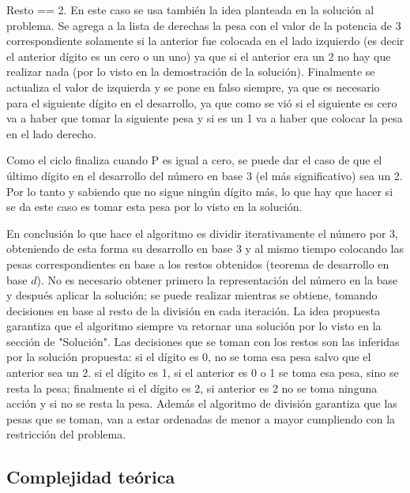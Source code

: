 \begin{enumerate}
{			Resto == 2. En este caso se usa también la idea planteada en la solución al problema. Se agrega a la lista de derechas la pesa con el valor de la potencia de 3 correspondiente solamente si la anterior fue colocada en el lado izquierdo (es decir el anterior dígito es un cero o un uno) ya que si el anterior era un 2 no hay que realizar nada (por lo visto en la demostración de la solución). Finalmente se actualiza el valor de izquierda y se pone en falso siempre, ya que es necesario para el siguiente dígito en el desarrollo, ya que como se vió si el siguiente es cero va a haber que tomar la siguiente pesa y si es un 1 va a haber que colocar la pesa en el lado derecho.	
		}
	\end{enumerate}

	Como el ciclo finaliza cuando P es igual a cero, se puede dar el caso de que el último dígito en el desarrollo del número en base 3 (el más significativo) sea un 2. Por lo tanto y sabiendo que no sigue ningún dígito más, lo que hay que hacer si se da este caso es tomar esta pesa por lo visto en la solución.

	En conclusión lo que hace el algoritmo es dividir iterativamente el número por 3, obteniendo de esta forma su desarrollo en base 3 y al mismo tiempo colocando las pesas correspondientes en base a los restos obtenidos (teorema de desarrollo en base $d$). No es necesario obtener primero la representación del número en la base y después aplicar la solución; se puede realizar mientras se obtiene, tomando decisiones en base al resto de la división en cada iteración. La idea propuesta garantiza que el algoritmo siempre va retornar una solución por lo visto en la sección de "Solución". Las decisiones que se toman con los restos son las inferidas por la solución propuesta: si el dígito es 0, no se toma esa pesa salvo que el anterior sea un 2. si el dígito es 1, si el anterior es 0 o 1 se toma esa pesa, sino se resta la pesa; finalmente si el dígito es 2, si anterior es 2 no se toma ninguna acción y si no se resta la pesa. Además el algoritmo de división garantiza que las pesas que se toman, van a estar ordenadas de menor a mayor cumpliendo con la restricción del problema.

	\subsection{Complejidad teórica}

